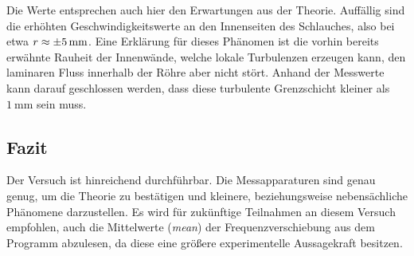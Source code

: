 Die Werte entsprechen auch hier den Erwartungen aus der Theorie. Auffällig sind die erhöhten Geschwindigkeitswerte an den Innenseiten des Schlauches, also bei etwa 
$r \approx \SI{\pm 5}{\milli\meter}$. Eine Erklärung für dieses Phänomen ist die vorhin bereits erwähnte Rauheit der Innenwände, welche lokale Turbulenzen erzeugen kann, den laminaren
Fluss innerhalb der Röhre aber nicht stört. Anhand der Messwerte kann darauf geschlossen werden, dass diese turbulente Grenzschicht kleiner als $\SI{1}{\milli\meter}$ sein muss.

\subsection{Fazit}
Der Versuch ist hinreichend durchführbar. Die Messapparaturen sind genau genug, um die Theorie zu bestätigen und kleinere, beziehungsweise nebensächliche Phänomene darzustellen.
Es wird für zukünftige Teilnahmen an diesem Versuch empfohlen, auch die Mittelwerte (\textit{mean}) der Frequenzverschiebung aus dem Programm abzulesen, da diese eine größere 
experimentelle Aussagekraft besitzen.